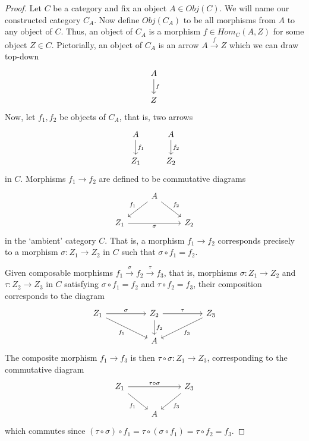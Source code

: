 \begin{proof}
    Let $C$ be a category and fix an object $A \in Obj(C)$.
    We will name our constructed category $C_{A}$.
    Now define $Obj(C_{A})$ to be all morphisms from $A$ to any object of $C$.
    Thus, an object of $C_{A}$ is a morphism $f \in Hom_C(A, Z)$ for some object $Z \in C$.
    Pictorially, an object of $C_{A}$ is an arrow $A \xrightarrow{f} Z$ which we can draw top-down
    \[
    \begin{tikzcd}
      A \arrow[d, "f"] \\
      Z
    \end{tikzcd}
    \]
    Now, let $f_1, f_2$ be objects of $C_A$, that is, two arrows
    \[
    \begin{tikzcd}
    A \arrow[d, "f_1"] \\
    Z_1
    \end{tikzcd}
    \quad\quad
    \begin{tikzcd}
    A \arrow[d, "f_2"] \\
    Z_2
    \end{tikzcd}
    \]
    in $C$. Morphisms $f_1 \longrightarrow f_2$ are defined to be commutative diagrams
    \[
    \begin{tikzcd}
    & A \arrow[dl, "f_1"'] \arrow[dr, "f_2"] & \\
    Z_1 \arrow[rr, "\sigma"'] & & Z_2
    \end{tikzcd}
    \]
    in the `ambient' category $C$.
    That is, a morphism $f_1 \longrightarrow f_2$ corresponds precisely to a morphism $\sigma : Z_1 \longrightarrow Z_2$
    in $C$ such that $\sigma \circ f_1 = f_2$.

    Given composable morphisms $f_1 \xrightarrow{\sigma} f_2 \xrightarrow{\tau} f_3$, that is, morphisms $\sigma : Z_1 \to Z_2$ and $\tau : Z_2 \to Z_3$ in $C$ satisfying
    $\sigma \circ f_1 = f_2$ and $\tau \circ f_2 = f_3$, their composition corresponds to
    the diagram
    \[
    \begin{tikzcd}
    Z_1 \arrow[rr, "\sigma"] \arrow[drr, "f_1"'] & & Z_2 \arrow[rr, "\tau"] \arrow[d, "f_2"] & & Z_3 \arrow[dll, "f_3"] \\
    & & A & &
    \end{tikzcd}
    \]
    The composite morphism $f_1 \longrightarrow f_3$ is then $\tau \circ \sigma : Z_1 \longrightarrow Z_3$,
    corresponding to the commutative diagram
    \[
    \begin{tikzcd}
      Z_1 \arrow[rr, "\tau \circ \sigma"] \arrow[dr, "f_1"'] & & Z_3 \arrow[dl, "f_3"] \\
      & A &
    \end{tikzcd}
    \]
    which commutes since $(\tau \circ \sigma) \circ f_1 = \tau \circ (\sigma \circ f_1) = \tau \circ f_2 = f_3$.
\end{proof}

